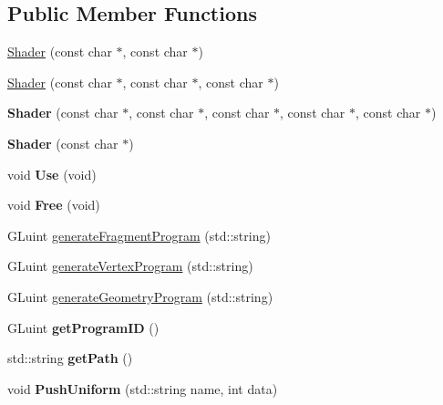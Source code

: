 \subsection*{Public Member Functions}
\begin{DoxyCompactItemize}
\item 
\hyperlink{class_shader_a06826fa137fa32fde05c3aca7605c6aa}{Shader} (const char $\ast$, const char $\ast$)
\item 
\hyperlink{class_shader_ad2181ad999b157a054376964f7c9cd69}{Shader} (const char $\ast$, const char $\ast$, const char $\ast$)
\item 
{\bfseries Shader} (const char $\ast$, const char $\ast$, const char $\ast$, const char $\ast$, const char $\ast$)\hypertarget{class_shader_acd0516c21ed4c18c13c7868c065dc5bf}{}\label{class_shader_acd0516c21ed4c18c13c7868c065dc5bf}

\item 
{\bfseries Shader} (const char $\ast$)\hypertarget{class_shader_a7496758169643a3d5c81eaae32909787}{}\label{class_shader_a7496758169643a3d5c81eaae32909787}

\item 
void {\bfseries Use} (void)\hypertarget{class_shader_a76c65e01a6f5f59d14913f296fcf6c8f}{}\label{class_shader_a76c65e01a6f5f59d14913f296fcf6c8f}

\item 
void {\bfseries Free} (void)\hypertarget{class_shader_a7b33ded961be380cf6ab32bbe284b2f7}{}\label{class_shader_a7b33ded961be380cf6ab32bbe284b2f7}

\item 
G\+Luint \hyperlink{class_shader_a5a3b99b6a5394a4e1e0e039dd05a2941}{generate\+Fragment\+Program} (std\+::string)
\item 
G\+Luint \hyperlink{class_shader_a411d170536d075c0c9e4681806aa607e}{generate\+Vertex\+Program} (std\+::string)
\item 
G\+Luint \hyperlink{class_shader_a862ac8720a1767a9f87e44c5be2f9166}{generate\+Geometry\+Program} (std\+::string)
\item 
G\+Luint {\bfseries get\+Program\+ID} ()\hypertarget{class_shader_a3be8bc123b4bc501887d268ae77e5dd6}{}\label{class_shader_a3be8bc123b4bc501887d268ae77e5dd6}

\item 
std\+::string {\bfseries get\+Path} ()\hypertarget{class_shader_a8c712f17cc553628f6e58299edca7483}{}\label{class_shader_a8c712f17cc553628f6e58299edca7483}

\item 
void {\bfseries Push\+Uniform} (std\+::string name, int data)\hypertarget{class_shader_aff6948c5b7d2b8a48bce4693ac88ee40}{}\label{class_shader_aff6948c5b7d2b8a48bce4693ac88ee40}


\end{DoxyCompactItemize}
